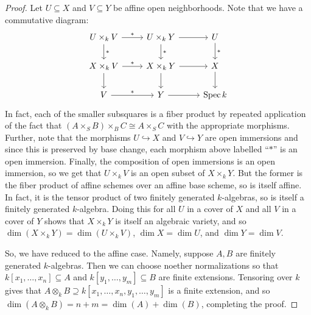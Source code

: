 \begin{proof}
	Let $U \subseteq X$ and $V \subseteq Y$ be affine open neighborhoods. Note that we have a commutative diagram:
	\[ \begin{tikzcd} U \times_k V \arrow[r, "\ast"] \arrow[d, "\ast"] & U \times_k Y \arrow[r] \arrow[d, "\ast"] & U \arrow[d, "\ast"] \\ X \times_k V \arrow[r, "\ast"] \arrow[d] & X \times_k Y \arrow[r] \arrow[d] & X \arrow[d] \\ V \arrow[r, "\ast"] & Y \arrow[r] & \Spec k \end{tikzcd} \]
	In fact, each of the smaller subsquares is a fiber product by repeated application of the fact that $(A \times_S B) \times_B C \cong A \times_S C$ with the appropriate morphisms. Further, note that the morphisms $U \hookrightarrow X$ and $V \hookrightarrow Y$ are open immersions and since this is preserved by base change, each morphism above labelled ``$\ast$'' is an open immersion. Finally, the composition of open immersions is an open immersion, so we get that $U \times_k V$ is an open subset of $X \times_k Y$. But the former is the fiber product of affine schemes over an affine base scheme, so is itself affine. In fact, it is the tensor product of two finitely generated $k$-algebras, so is itself a finitely generated $k$-algebra. Doing this for all $U$ in a cover of $X$ and all $V$ in a cover of $Y$ shows that $X \times_k Y$ is itself an algebraic variety, and so $\dim(X \times_k Y) = \dim(U \times_k V)$, $\dim X = \dim U$, and $\dim Y = \dim V$.
	
	So, we have reduced to the affine case. Namely, suppose $A,B$ are finitely generated $k$-algebras. Then we can choose noether normalizations so that $k[x_1,\ldots,x_n] \subseteq A$ and $k[y_1,\ldots,y_m] \subseteq B$ are finite extensions. Tensoring over $k$ gives that $A \otimes_k B \supseteq k[x_1,\ldots,x_n,y_1,\ldots,y_m]$ is a finite extension, and so $\dim(A \otimes_k B) = n+m = \dim(A) + \dim(B)$, completing the proof.
\end{proof}
